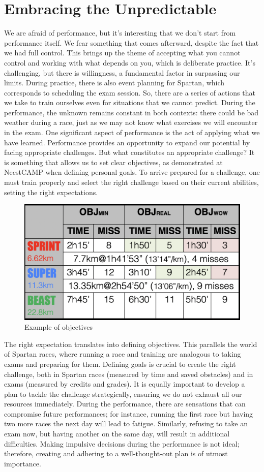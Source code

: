 \documentclass[12pt,oneside,a4paper]{article}
\begin{document}
\section{Embracing the Unpredictable} \label{sec:uncont}
We are afraid of performance, but it's interesting that we don't start from performance itself. We fear something that comes afterward, despite the fact that we had full control. This brings up the theme of accepting what you cannot control and working with what depends on you, which is deliberate practice. It's challenging, but there is willingness, a fundamental factor in surpassing our limits.
During practice, there is also event planning for Spartan, which corresponds to scheduling the exam session. So, there are a series of actions that we take to train ourselves even for situations that we cannot predict. During the performance, the unknown remains constant in both contexts: there could be bad weather during a race, just as we may not know what exercises we will encounter in the exam. One significant aspect of performance is the act of applying what we have learned. Performance provides an opportunity to expand our potential by facing appropriate challenges. But what constitutes an appropriate challenge? It is something that allows us to set clear objectives, as demonstrated at NecstCAMP when defining personal goals. To arrive prepared for a challenge, one must train properly and select the right challenge based on their current abilities, setting the right expectations. 
\begin{figure}[h]
    \centering
    \includegraphics[width=.7\textwidth]{tabella.png}
    \caption{Example of objectives}
    \label{fig:my_label}
\end{figure}
The right expectation translates into defining objectives. This parallels the world of Spartan races, where running a race and training are analogous to taking exams and preparing for them. Defining goals is crucial to create the right challenge, both in Spartan races (measured by time and saved obstacles) and in exams (measured by credits and grades). It is equally important to develop a plan to tackle the challenge strategically, ensuring we do not exhaust all our resources immediately. During the performance, there are sensations that can compromise future performances; for instance, running the first race but having two more races the next day will lead to fatigue. Similarly, refusing to take an exam now, but having another on the same day, will result in additional difficulties. Making impulsive decisions during the performance is not ideal; therefore, creating and adhering to a well-thought-out plan is of utmost importance.
\end{document}
